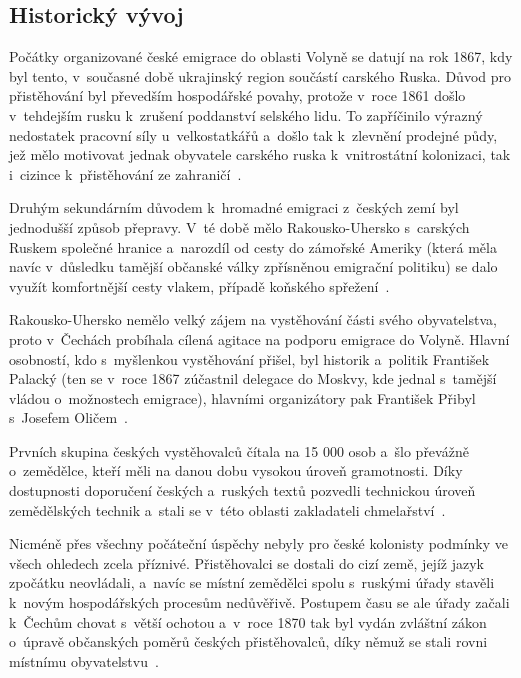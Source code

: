 \hypertarget{historickuxfd-vuxfdvoj-1}{%
\subsection*{Historický vývoj}\label{historickuxfd-vuxfdvoj-1}}

Počátky organizované české emigrace do oblasti Volyně se datují na rok 1867, kdy byl tento, v~současné době ukrajinský region součástí carského Ruska. Důvod pro přistěhování byl převedším hospodářské povahy, protože v~roce 1861 došlo v~tehdejším rusku k~zrušení poddanství selského lidu. To zapříčinilo výrazný nedostatek pracovní síly u~velkostatkářů a~došlo tak k~zlevnění prodejné půdy, jež mělo motivovat jednak obyvatele carského ruska k~vnitrostátní kolonizaci, tak i~cizince k~přistěhování ze zahraničí~\parencite{Auerhan1920}.

Druhým sekundárním důvodem k~hromadné emigraci z~českých zemí byl jednodušší způsob přepravy. V~té době mělo Rakousko-Uhersko s~carských Ruskem společné hranice a~narozdíl od cesty do zámořské Ameriky (která měla navíc v~důsledku tamější občanské války zpřísněnou emigrační politiku) se dalo využít komfortnější cesty vlakem, případě koňského spřežení~\parencite{Hofman2020}.

Rakousko-Uhersko nemělo velký zájem na vystěhování části svého obyvatelstva, proto v~Čechách probíhala cílená agitace na podporu emigrace do Volyně. Hlavní osobností, kdo s~myšlenkou vystěhování přišel, byl historik a~politik František Palacký (ten se v~roce 1867 zúčastnil delegace do Moskvy, kde jednal s~tamější vládou o~možnostech emigrace), hlavními organizátory pak František Přibyl s~Josefem Oličem~\parencite{Hofman2020}.

Prvních skupina českých vystěhovalců čítala na 15 000 osob a~šlo převážně o~zemědělce, kteří měli na danou dobu vysokou úroveň gramotnosti. Díky dostupnosti doporučení českých a~ruských textů pozvedli technickou úroveň zemědělských technik a~stali se v~této oblasti zakladateli chmelařství~\parencite{Vaculik2009b}.

Nicméně přes všechny počáteční úspěchy nebyly pro české kolonisty podmínky ve všech ohledech zcela příznivé. Přistěhovalci se dostali do cizí země, jejíž jazyk zpočátku neovládali, a~navíc se místní zemědělci spolu s~ruskými úřady stavěli k~novým hospodářských procesům nedůvěřivě. Postupem času se ale úřady začali k~Čechům chovat s~větší ochotou a~v~roce 1870 tak byl vydán zvláštní zákon o~úpravě občanských poměrů českých přistěhovalců, díky němuž se stali rovni místnímu obyvatelstvu~\parencite{Auerhan1920}.

